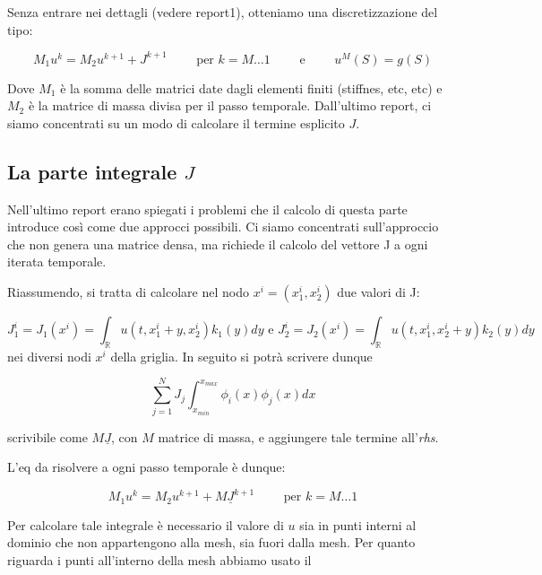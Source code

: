 \documentclass[a4paper,10pt]{article}
\begin{document}
Senza entrare nei dettagli (vedere report1), otteniamo una discretizzazione del tipo:

\begin{equation}
 M_1u^k=M_2u^{k+1}+J^{k+1}  \qquad \text{ per } k=M\dots1 \qquad \text{ e } \qquad u^{M}(S)=g(S) 
\end{equation}

Dove $M_1$ è la somma delle matrici date dagli elementi finiti (stiffnes, etc, etc) e $M_2$ è la matrice di massa divisa per il passo temporale. Dall'ultimo report, ci siamo concentrati su un modo di calcolare il termine esplicito $J$.

\subsection{La parte integrale $J$}

Nell'ultimo report erano spiegati i problemi che il calcolo di questa parte introduce così come due approcci possibili. Ci siamo concentrati sull'approccio che non genera una matrice densa, ma richiede il calcolo del vettore J a ogni iterata temporale.

Riassumendo, si tratta di calcolare nel nodo $x^i=(x_1^i,x_2^i)$ due valori di J: 

\begin{equation*}
 J_1^i=J_1(x^i)=\int_\mathbb{R}u(t,x_1^i+y,x_2^i)k_1(y)dy \text{ e } J_2^i=J_2(x^i)=\int_\mathbb{R}u(t,x_1^i,x_2^i+y)k_2(y)dy
\end{equation*}
nei diversi nodi $x^i$ della griglia. In seguito si potrà scrivere dunque 

\begin{equation*}
 \sum_{j=1}^N J_j\int_{x_{min}}^{x_{max}} \phi_i(x)\phi_j(x)dx
\end{equation*}

scrivibile come $M\underline{J}$, con $M$ matrice di massa, e aggiungere tale termine all'\emph{rhs}.

L'eq da risolvere a ogni passo temporale è dunque:

\begin{equation*}
 M_1u^k=M_2u^{k+1}+M\underline{J}^{k+1}  \qquad \text{ per } k=M\dots1
\end{equation*}


Per calcolare tale integrale è necessario il valore di $u$ sia in punti interni al dominio che non appartengono alla mesh, sia fuori dalla mesh. Per quanto riguarda i punti all'interno della mesh abbiamo usato il 
\end{document}

